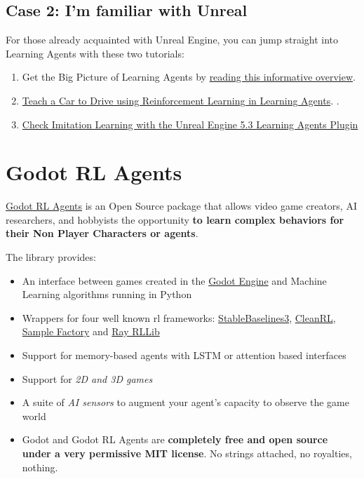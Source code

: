 \documentclass[11pt,a4paper]{article}
\begin{document}
\subsection{Case 2: I'm familiar with Unreal}\label{case-2-im-familiar-with-unreal}

For those already acquainted with Unreal Engine, you can jump straight into Learning Agents with these two tutorials:

\begin{enumerate}
\def\labelenumi{\arabic{enumi}.}
\item
  Get the Big Picture of Learning Agents by \href{https://dev.epicgames.com/community/learning/tutorials/8OWY/unreal-engine-learning-agents-introduction}{reading this informative overview}.
\item
  \href{https://dev.epicgames.com/community/learning/tutorials/qj2O/unreal-engine-learning-to-drive}{Teach a Car to Drive using Reinforcement Learning in Learning Agents}. .
\item
  \href{https://www.youtube.com/watch?v=NwYUNlFvajQ}{Check Imitation Learning with the Unreal Engine 5.3 Learning Agents Plugin}
\end{enumerate}

\section{Godot RL Agents}\label{godot-rl-agents}

\href{https://github.com/edbeeching/godot_rl_agents}{Godot RL Agents} is an Open Source package that allows video game creators, AI researchers, and hobbyists the opportunity \textbf{to learn complex behaviors for their Non Player Characters or agents}.

The library provides:

\begin{itemize}
\item
  An interface between games created in the \href{https://godotengine.org/}{Godot Engine} and Machine Learning algorithms running in Python
\item
  Wrappers for four well known rl frameworks: \href{https://stable-baselines3.readthedocs.io/en/master/}{StableBaselines3}, \href{https://docs.cleanrl.dev/}{CleanRL}, \href{https://www.samplefactory.dev/}{Sample Factory} and \href{https://docs.ray.io/en/latest/rllib-algorithms.html}{Ray RLLib}
\item
  Support for memory-based agents with LSTM or attention based interfaces
\item
  Support for \emph{2D and 3D games}
\item
  A suite of \emph{AI sensors} to augment your agent's capacity to observe the game world
\item
  Godot and Godot RL Agents are \textbf{completely free and open source under a very permissive MIT license}. No strings attached, no royalties, nothing.
\end{itemize}
\end{document}
